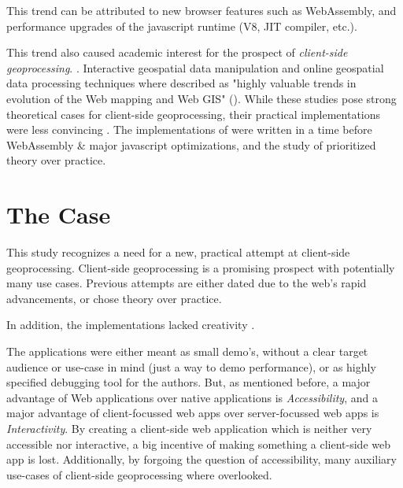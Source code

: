This trend can be attributed to new browser features such as WebAssembly, and performance upgrades of the javascript runtime (V8, JIT compiler, etc.).

This trend also caused academic interest for the prospect of \emph{client-side geoprocessing}. \cite{kulawiak_analysis_2019, panidi_hybrid_2015, hamilton_client-side_2014}. 
Interactive geospatial data manipulation and online geospatial data processing techniques where described as "highly valuable trends in evolution of the Web mapping and Web GIS" (\cite{panidi_hybrid_2015}). 
While these studies pose strong theoretical cases for client-side geoprocessing, their practical implementations were less convincing . 
The implementations of \cite{panidi_hybrid_2015, hamilton_client-side_2014} were written in a time before WebAssembly \& major javascript optimizations, and the study of \cite{kulawiak_analysis_2019} prioritized theory over practice. 


\section{ The Case }


This study recognizes a need for a new, practical attempt at client-side geoprocessing. 
Client-side geoprocessing is a promising prospect with potentially many use cases.
Previous attempts are either dated due to the web's rapid advancements, or chose theory over practice.

In addition, the implementations lacked creativity . 

The applications were either meant as small demo's, without a clear target audience or use-case in mind (just a way to demo performance), or as highly specified debugging tool for the authors.   
But, as mentioned before, a major advantage of Web applications over native applications is \emph{Accessibility}, and a major advantage of client-focussed web apps over server-focussed web apps is \emph{Interactivity}. 
By creating a client-side web application which is neither very accessible nor interactive, a big incentive of making something a client-side web app is lost.
Additionally, by forgoing the question of accessibility, many auxiliary use-cases of client-side geoprocessing where overlooked.

